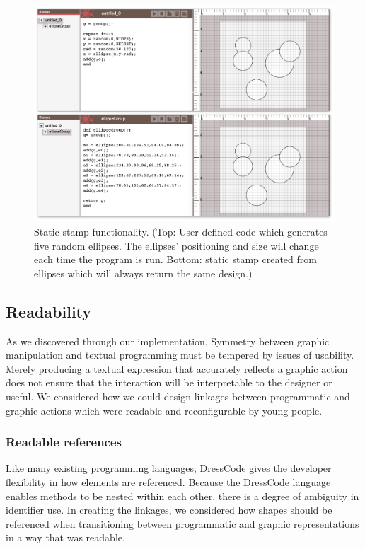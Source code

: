 \documentclass{sigchi}
\begin{document}
\begin{center}
\begin{figure}[h!]
\includegraphics[width=\columnwidth]{images/stamps.jpg}
\caption{Static stamp functionality. (Top: User defined code which generates five random ellipses. The ellipses' positioning and size will change each time the program is run. Bottom: static stamp created from ellipses which will always return the same design.)}
\label{fig:stamps}
\end{figure}
\end{center}
\vspace{20pt}

\subsection{Readability}
\label{subsec:readability}
As we discovered through our implementation, Symmetry between graphic manipulation and textual programming must be tempered by issues of usability. Merely producing a textual expression that accurately reflects a graphic action does not ensure that the interaction will be interpretable to the designer or useful. We considered how we could design linkages between programmatic and graphic actions which were readable and reconfigurable by young people.

\subsubsection{Readable references}
Like many existing programming languages, DressCode gives the developer flexibility in how elements are referenced. Because the DressCode language enables methods to be nested within each other, there is a degree of ambiguity in identifier use. In creating the linkages, we considered how shapes should be referenced when transitioning between programmatic and graphic representations in a way that was readable. 
\end{document}
